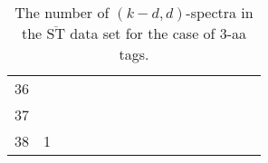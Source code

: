 \documentclass{article}
\def\STbar{{\overline{\mathrm{ST}}}}
\begin{document}
\begin{table}[h]
{\begin{tabular}{|c|c|
c|c|c|c|c|c|c|c|c|c|c|c|c|c|}
36  &  &  &  &  &  &  &  &  &  &  &  &  &  &  & \\

37  &  &  &  &  &  &  &  &  &  &  &  &  &  &  & \\

38  & 1 &  &  &  &  &  &  &  &  &  &  &  &  &  & \\

  \hline
\end{tabular}
\par}
\centering
\caption{The number of $(k-d,d)$-spectra in the $\STbar$ data set for the case of 3-aa tags.}
\vspace{3mm}
\label{table:kd-1-ST}
\end{table}
\end{document}
